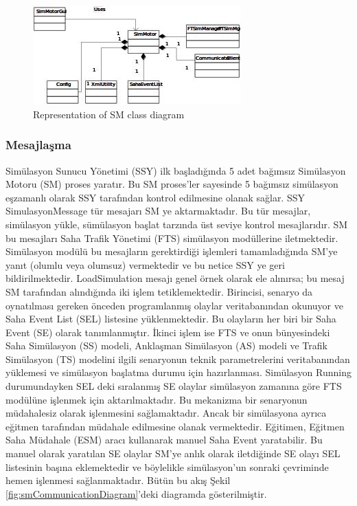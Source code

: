 \documentclass[conference]{IEEEtran}
\begin{document}
\begin{figure}[h!]
  \centering
  \includegraphics[width=8cm]{smgrafic.jpg}
  \caption{Representation of SM class diagram}\label{fig:smgrafic}
\end{figure}



\subsubsection{Mesajlaşma}
Simülasyon Sunucu Yönetimi (SSY) ilk başladığında 5 adet bağımsız Simülasyon Motoru (SM) proses yaratır. Bu SM proses’ler sayesinde 5 bağımsız simülasyon eşzamanlı olarak SSY tarafından kontrol edilmesine olanak sağlar. SSY SimulasyonMessage tür mesajarı SM ye aktarmaktadır. Bu tür mesajlar, simülasyon yükle, sümülasyon başlat tarzında üst seviye kontrol mesajlarıdır. SM bu mesajları Saha Trafik Yönetimi (FTS) simülasyon modüllerine iletmektedir. Simülasyon modülü bu mesajların gerektirdiği işlemleri tamamladığında SM’ye yanıt (olumlu veya olumsuz) vermektedir ve bu netice SSY ye geri bildirilmektedir.
LoadSimulation mesajı genel örnek olarak ele alınırsa; bu mesaj SM tarafından alındığında iki işlem tetiklemektedir. Birincisi, senaryo da oynatılması gereken önceden programlanmış olaylar veritabanından okunuyor ve Saha Event List (SEL) listesine yüklenmektedir. Bu olayların her biri bir Saha Event (SE) olarak tanımlanmıştır. 
İkinci işlem ise FTS ve onun bünyesindeki Saha Simülasyon (SS) modeli, Anklaşman Simülasyon (AS) modeli ve Trafik Simülasyon (TS) modelini ilgili senaryonun teknik parametrelerini veritabanından yüklemesi ve simülasyon başlatma durumu için hazırlanması.
Simülasyon Running durumundayken SEL deki sıralanmış SE olaylar simülasyon zamanına göre FTS modülüne işlenmek için aktarılmaktadır. Bu mekanizma bir senaryonun müdahalesiz olarak işlenmesini sağlamaktadır. Ancak bir simülasyona ayrıca eğitmen tarafından müdahale edilmesine olanak vermektedir. Eğitimen, Eğitmen Saha Müdahale (ESM) aracı kullanarak manuel Saha Event yaratabilir. Bu manuel olarak yaratılan SE olaylar SM’ye anlık olarak iletdiğinde SE olayı SEL listesinin başına eklemektedir ve böylelikle simülasyon’un sonraki çevriminde hemen işlenmesi sağlanmaktadır. Bütün bu akış Şekil \ref{fig:smCommunicationDiagram}'deki diagramda gösterilmiştir.
\end{document}
